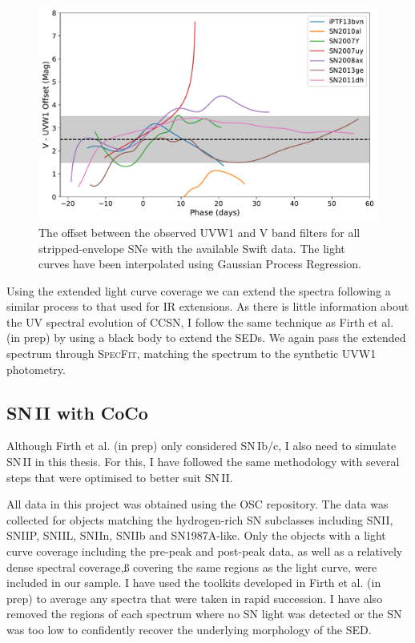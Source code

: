 \begin{figure}
  \centering
  \includegraphics[width=\textwidth]{Figures/Chapter3/VOffset_Ibc}
  \caption{The offset between the observed UVW1 and V band filters for all stripped-envelope SNe with the available Swift data. The light curves have been interpolated using Gaussian Process Regression.}
  \label{fig:VvsUVW1}
\end{figure}

Using the extended light curve coverage we can extend the spectra following a similar process to that used for IR extensions. As there is little information about the UV spectral evolution of CCSN, I follow the same technique as Firth et al. (in prep) by using a black body to extend the SEDs. We again pass the extended spectrum through \textsc{SpecFit}, matching the spectrum to the synthetic UVW1 photometry.

\subsection{SN\,II with CoCo}
Although Firth et al. (in prep) only considered SN\,Ib/c, I also need to simulate SN\,II in this thesis. For this, I have followed the same methodology with several steps that were optimised to better suit SN\,II.

All data in this project was obtained using the OSC repository. The data was collected for objects matching the hydrogen-rich SN subclasses including SNII, SNIIP, SNIIL, SNIIn, SNIIb and SN1987A-like. Only the objects with a light curve coverage including the pre-peak and post-peak data, as well as a relatively dense spectral coverage,ß        covering the same regions as the light curve, were included in our sample. I have used the toolkits developed in Firth et al. (in prep) to average any spectra that were taken in rapid succession. I have also removed the regions of each spectrum where no SN light was detected or the S\/N was too low to confidently recover the underlying morphology of the SED.

